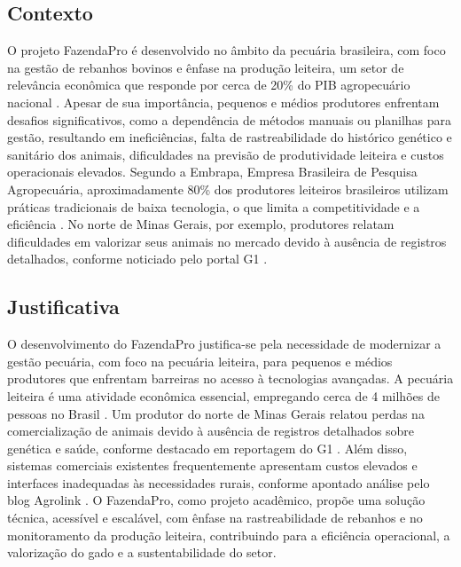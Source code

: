 \documentclass[12pt, a4paper]{article}
\begin{document}
\subsection{Contexto}
\begin{spacing}{1.5}
O projeto FazendaPro é desenvolvido no âmbito da pecuária brasileira, com foco na gestão de rebanhos bovinos e ênfase na produção leiteira, um setor de relevância econômica que responde por cerca de 20\% do PIB agropecuário nacional \cite{agro20}. Apesar de sua importância, pequenos e médios produtores enfrentam desafios significativos, como a dependência de métodos manuais ou planilhas para gestão, resultando em ineficiências, falta de rastreabilidade do histórico genético e sanitário dos animais, dificuldades na previsão de produtividade leiteira e custos operacionais elevados. Segundo a Embrapa, Empresa Brasileira de Pesquisa Agropecuária,  aproximadamente 80\% dos produtores leiteiros brasileiros utilizam práticas tradicionais de baixa tecnologia, o que limita a competitividade e a eficiência \cite{anuario2023}. No norte de Minas Gerais, por exemplo, produtores relatam dificuldades em valorizar seus animais no mercado devido à ausência de registros detalhados, conforme noticiado pelo portal G1 \cite{g12022}.
\end{spacing}

\subsection{Justificativa}
\begin{spacing}{1.5}
O desenvolvimento do FazendaPro justifica-se pela necessidade de modernizar a gestão pecuária, com foco na pecuária leiteira, para pequenos e médios produtores que enfrentam barreiras no acesso à tecnologias avançadas. A pecuária leiteira é uma atividade econômica essencial, empregando cerca de 4 milhões de pessoas no Brasil \cite{4milhao}. Um produtor do norte de Minas Gerais relatou perdas na comercialização de animais devido à ausência de registros detalhados sobre genética e saúde, conforme destacado em reportagem do G1 \cite{g12022}. Além disso, sistemas comerciais existentes frequentemente apresentam custos elevados e interfaces inadequadas às necessidades rurais, conforme apontado análise pelo blog Agrolink \cite{agropec2024}. O FazendaPro, como projeto acadêmico, propõe uma solução técnica, acessível e escalável, com ênfase na rastreabilidade de rebanhos e no monitoramento da produção leiteira, contribuindo para a eficiência operacional, a valorização do gado e a sustentabilidade do setor.
\end{spacing}
\end{document}
